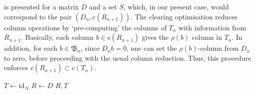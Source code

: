 \documentclass[11pt, table, nothms]{amsart}
\theoremstyle{definition}
\newcommand{\fB}{\mathfrak{B}}
\newcommand{\id}{\mathrm{id}}
\begin{document}
{ is presented for a matrix $D$ and a set $S$, which, in our present case, would correspond to the pair $(D_n,c(R_{n+1}))$. 
The clearing optimisation reduces column operations by `pre-computing' the columns of $T_n$ with information from $R_{n+1}$. 
Basically, each column $b \in c(R_{n+1})$ gives the $\rho(b)$ column in $T_n$. In addition, for each $b \in \fB_n$, since $D_nb=0$, one can set the $\rho(b)$-column from $D_n$ to zero, before proceeding with the usual column reduction. Thus, this procedure enforces $c(R_{n+1})\subset c(T_n)$. 

\begin{algorithm}
\caption{\texttt{clear\_reduce}}\label{alg:clear-reduce}
 $T \gets \id_{N}$ \;
 $R \gets D$ \;
\Return $R, T$
\end{algorithm}


}
\end{document}
